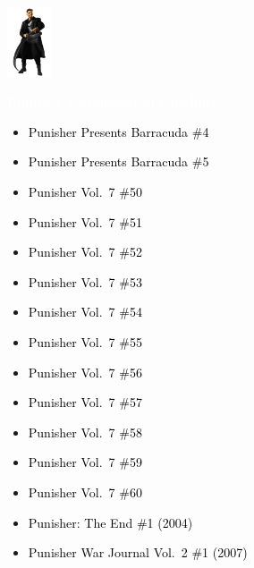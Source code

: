 \documentclass[12pt]{article}
\newcommand{\checkbox}{\raisebox{0.0ex}{\fbox{\rule{0ex}{1.5ex} \rule{1.5ex}{0ex}}}}
\begin{document}
\begin{center}
    \vspace*{2cm}
    \includegraphics[width=0.1\textwidth]{PUNISHER1.PNG}
    \vspace{0.3cm}

    {\Huge \textbf{\textcolor{white}{Punisher Chronological Checklist}}}
\end{center}

\vspace{0.3cm}
\noindent
\begin{tcolorbox}[
  colback=white!95!gray,
  colframe=black,
  width=\textwidth,
  arc=4mm,
  auto outer arc,
  boxrule=0.8pt,
  left=8pt,right=8pt,top=8pt,bottom=8pt
]
\begin{itemize}[left=0pt,label={\checkbox}]
    \item \textcolor{black}{Punisher Presents Barracuda \#4}
    \item \textcolor{black}{Punisher Presents Barracuda \#5}
    \item \textcolor{black}{Punisher Vol.\ 7 \#50}
    \item \textcolor{black}{Punisher Vol.\ 7 \#51}
    \item \textcolor{black}{Punisher Vol.\ 7 \#52}
    \item \textcolor{black}{Punisher Vol.\ 7 \#53}
    \item \textcolor{black}{Punisher Vol.\ 7 \#54}
    \item \textcolor{black}{Punisher Vol.\ 7 \#55}
    \item \textcolor{black}{Punisher Vol.\ 7 \#56}
    \item \textcolor{black}{Punisher Vol.\ 7 \#57}
    \item \textcolor{black}{Punisher Vol.\ 7 \#58}
    \item \textcolor{black}{Punisher Vol.\ 7 \#59}
    \item \textcolor{black}{Punisher Vol.\ 7 \#60}
    \item \textcolor{black}{Punisher: The End \#1 (2004)}
    \item \textcolor{black}{Punisher War Journal Vol.\ 2 \#1 (2007)}
\end{itemize}
\end{tcolorbox}
\end{document}
